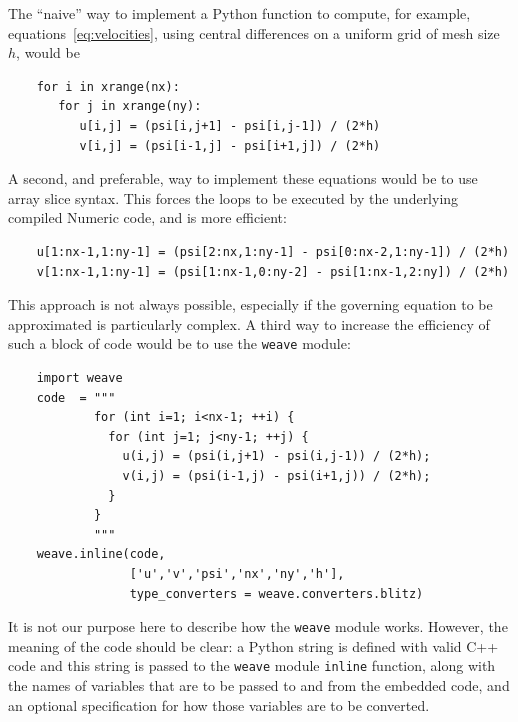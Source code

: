 \documentclass[acmtocl]{acmtrans2m}
\begin{document}
The ``naive'' way to implement a Python function to compute, for
example, equations~\ref{eq:velocities}, using central differences on a
uniform grid of mesh size $h$, would be
\begin{verbatim}
    for i in xrange(nx):
       for j in xrange(ny):
          u[i,j] = (psi[i,j+1] - psi[i,j-1]) / (2*h)
          v[i,j] = (psi[i-1,j] - psi[i+1,j]) / (2*h)
\end{verbatim}
A second, and preferable, way to implement these equations would be to
use array slice syntax.  This forces the loops to be executed by the
underlying compiled Numeric code, and is more efficient:
\begin{verbatim}
    u[1:nx-1,1:ny-1] = (psi[2:nx,1:ny-1] - psi[0:nx-2,1:ny-1]) / (2*h)
    v[1:nx-1,1:ny-1] = (psi[1:nx-1,0:ny-2] - psi[1:nx-1,2:ny]) / (2*h)
\end{verbatim}
This approach is not always possible, especially if the governing
equation to be approximated is particularly complex.  A third way to
increase the efficiency of such a block of code would be to use the
{\tt weave} module:
\begin{verbatim}
    import weave
    code  = """
            for (int i=1; i<nx-1; ++i) {
              for (int j=1; j<ny-1; ++j) {
                u(i,j) = (psi(i,j+1) - psi(i,j-1)) / (2*h);
                v(i,j) = (psi(i-1,j) - psi(i+1,j)) / (2*h);
              }
            }
            """
    weave.inline(code,
                 ['u','v','psi','nx','ny','h'],
                 type_converters = weave.converters.blitz)
\end{verbatim}
It is not our purpose here to describe how the {\tt weave} module
works.  However, the meaning of the code should be clear: a Python
string is defined with valid C++ code and this string is passed to the
{\tt weave} module {\tt inline} function, along with the names of
variables that are to be passed to and from the embedded code, and an
optional specification for how those variables are to be converted.
\end{document}
